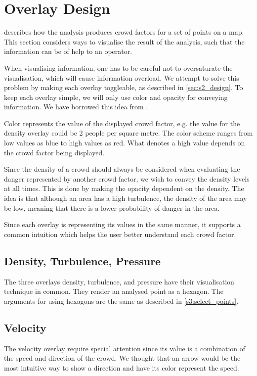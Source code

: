 \section{Overlay Design} \label{sec:s4_overlay}

 describes how the analysis produces crowd factors for a set of points on a map. This section considers ways to visualise the result of the analysis, such that the information can be of help to an operator.

When visualising information, one has to be careful not to oversaturate the visualisation, which will cause information overload. We attempt to solve this problem by making each overlay toggleable, as described in \cref{sec:s2_design}. To keep each overlay simple, we will only use color and opacity for conveying information. We have borrowed this idea from \citet{wirz2012inferring}.

Color represents the value of the displayed crowd factor, e.g. the value for the density overlay could be 2 people per square metre. The color scheme ranges from low values as blue to high values as red. What denotes a high value depends on the crowd factor being displayed.

Since the density of a crowd should always be considered when evaluating the danger represented by another crowd factor, we wish to convey the density levels at all times. This is done by making the opacity dependent on the density. The idea is that although an area has a high turbulence, the density of the area may be low, meaning that there is a lower probability of danger in the area.

Since each overlay is representing its values in the same manner, it supports a common intuition which helps the user better understand each crowd factor.

\subsection{Density, Turbulence, Pressure}
The three overlays density, turbulence, and pressure have their visualisation technique in common. They render an analysed point as a hexagon. The arguments for using hexagons are the same as described in \cref{s3:select_points}.

\subsection{Velocity}
The velocity overlay require special attention since its value is a combination of the speed and direction of the crowd. We thought that an arrow would be the most intuitive way to show a direction and have its color represent the speed.

